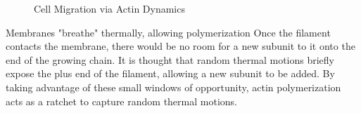 \documentclass[../main.tex]{subfiles}
\begin{document}
\begin{figure}[H]
	\centering
	\caption{Cell Migration via Actin Dynamics}
\end{figure}

\begin{RemarkWithTitel}{Membranes "breathe" thermally, allowing polymerization}
	Once the filament contacts the membrane, there would be no room for a new subunit to it onto the end of the growing chain. It is thought that random thermal motions briefly expose the plus end of the filament, allowing a new subunit to be added. By taking advantage of these small windows of opportunity, actin polymerization acts as a ratchet to capture random thermal motions.
\end{RemarkWithTitel}
\end{document}
